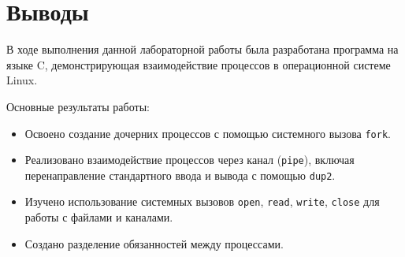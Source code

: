 \section{Выводы}

В ходе выполнения данной лабораторной работы была разработана программа на языке C, демонстрирующая взаимодействие процессов в операционной системе Linux. 

Основные результаты работы:

\begin{itemize}
    \item Освоено создание дочерних процессов с помощью системного вызова \texttt{fork}.
    \item Реализовано взаимодействие процессов через канал (\texttt{pipe}), включая перенаправление стандартного ввода и вывода с помощью \texttt{dup2}.
    \item Изучено использование системных вызовов \texttt{open}, \texttt{read}, \texttt{write}, \texttt{close} для работы с файлами и каналами.
    \item Создано разделение обязанностей между процессами.
\end{itemize}

\pagebreak